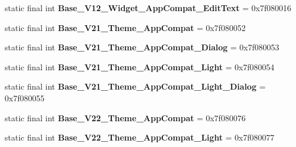 \begin{DoxyCompactItemize}
\item 
\hypertarget{classandroid_1_1support_1_1design_1_1_r_1_1style_a2ef7dc7719b4995a7d83175eba5cc94d}{}static final int {\bfseries Base\+\_\+\+V12\+\_\+\+Widget\+\_\+\+App\+Compat\+\_\+\+Edit\+Text} = 0x7f080016\label{classandroid_1_1support_1_1design_1_1_r_1_1style_a2ef7dc7719b4995a7d83175eba5cc94d}

\item 
\hypertarget{classandroid_1_1support_1_1design_1_1_r_1_1style_a045c026a1af92dd4ce48bf60c97acc81}{}static final int {\bfseries Base\+\_\+\+V21\+\_\+\+Theme\+\_\+\+App\+Compat} = 0x7f080052\label{classandroid_1_1support_1_1design_1_1_r_1_1style_a045c026a1af92dd4ce48bf60c97acc81}

\item 
\hypertarget{classandroid_1_1support_1_1design_1_1_r_1_1style_a51e2e39ba5d5b1fee8e36f3f94ba322c}{}static final int {\bfseries Base\+\_\+\+V21\+\_\+\+Theme\+\_\+\+App\+Compat\+\_\+\+Dialog} = 0x7f080053\label{classandroid_1_1support_1_1design_1_1_r_1_1style_a51e2e39ba5d5b1fee8e36f3f94ba322c}

\item 
\hypertarget{classandroid_1_1support_1_1design_1_1_r_1_1style_a556541f7e4e26b1bcb1ff6453aabb3f3}{}static final int {\bfseries Base\+\_\+\+V21\+\_\+\+Theme\+\_\+\+App\+Compat\+\_\+\+Light} = 0x7f080054\label{classandroid_1_1support_1_1design_1_1_r_1_1style_a556541f7e4e26b1bcb1ff6453aabb3f3}

\item 
\hypertarget{classandroid_1_1support_1_1design_1_1_r_1_1style_a48e4536d181ab3cb02271d068b3c5443}{}static final int {\bfseries Base\+\_\+\+V21\+\_\+\+Theme\+\_\+\+App\+Compat\+\_\+\+Light\+\_\+\+Dialog} = 0x7f080055\label{classandroid_1_1support_1_1design_1_1_r_1_1style_a48e4536d181ab3cb02271d068b3c5443}

\item 
\hypertarget{classandroid_1_1support_1_1design_1_1_r_1_1style_aa23076039edd6ad473bdc34aa6d8547b}{}static final int {\bfseries Base\+\_\+\+V22\+\_\+\+Theme\+\_\+\+App\+Compat} = 0x7f080076\label{classandroid_1_1support_1_1design_1_1_r_1_1style_aa23076039edd6ad473bdc34aa6d8547b}

\item 
\hypertarget{classandroid_1_1support_1_1design_1_1_r_1_1style_abd60acce4aabee6976bca2367aa5772c}{}static final int {\bfseries Base\+\_\+\+V22\+\_\+\+Theme\+\_\+\+App\+Compat\+\_\+\+Light} = 0x7f080077\label{classandroid_1_1support_1_1design_1_1_r_1_1style_abd60acce4aabee6976bca2367aa5772c}


\end{DoxyCompactItemize}
